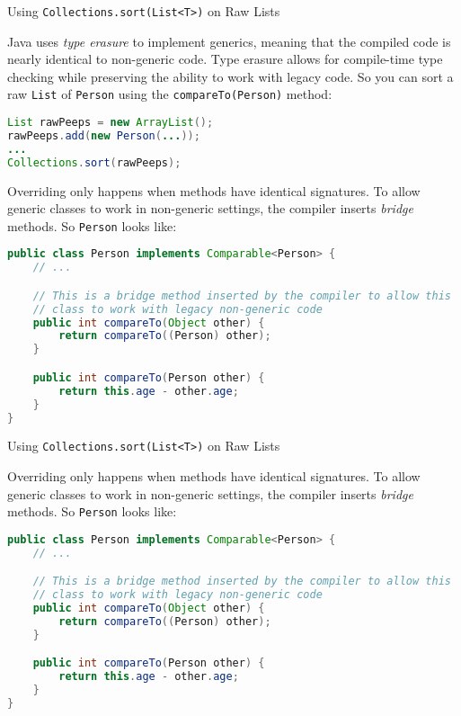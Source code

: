 \documentclass{beamer}
\begin{document}
\begin{frame}[fragile]{Using {\tt Collections.sort(List<T>)} on Raw Lists}

Java uses {\it type erasure} to implement generics, meaning that the compiled code is nearly identical to non-generic code.  Type erasure allows for compile-time type checking while preserving the ability to work with legacy code.  So you can sort a raw {\tt List} of {\tt Person} using the {\tt compareTo(Person)} method:

\begin{lstlisting}[language=Java]
List rawPeeps = new ArrayList();
rawPeeps.add(new Person(...));
...
Collections.sort(rawPeeps);
\end{lstlisting}

Overriding only happens when methods have identical signatures.  To allow generic classes to work in non-generic settings, the compiler inserts {\it bridge} methods.  So {\tt Person} looks like:

\begin{lstlisting}[language=Java]
public class Person implements Comparable<Person> {
    // ...

    // This is a bridge method inserted by the compiler to allow this
    // class to work with legacy non-generic code
    public int compareTo(Object other) {
        return compareTo((Person) other);
    }

    public int compareTo(Person other) {
        return this.age - other.age;
    }
}
\end{lstlisting}

\end{frame}

\begin{frame}[fragile]{Using {\tt Collections.sort(List<T>)} on Raw Lists}

Overriding only happens when methods have identical signatures.  To allow generic classes to work in non-generic settings, the compiler inserts {\it bridge} methods.  So {\tt Person} looks like:

\begin{lstlisting}[language=Java]
public class Person implements Comparable<Person> {
    // ...

    // This is a bridge method inserted by the compiler to allow this
    // class to work with legacy non-generic code
    public int compareTo(Object other) {
        return compareTo((Person) other);
    }

    public int compareTo(Person other) {
        return this.age - other.age;
    }
}
\end{lstlisting}

\end{frame}
\end{document}
